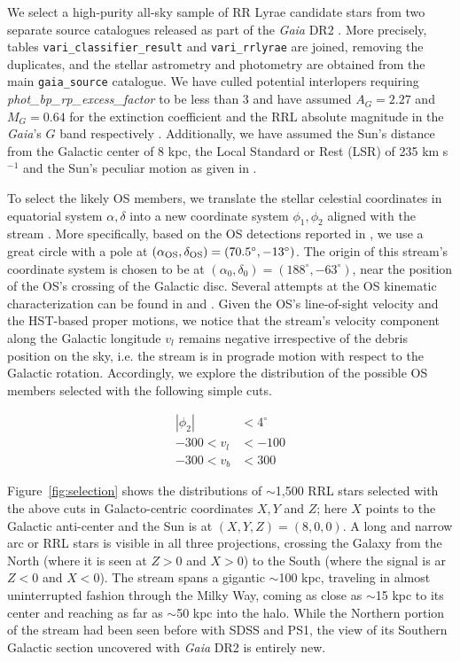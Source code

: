 \documentclass[a4paper,useAMS,usenatbib]{mnras}
\newcommand{\Gaia}{{\it Gaia}}
\newcommand{\gaia}{\textit{Gaia} }
\begin{document}
We select a high-purity all-sky sample of RR Lyrae candidate stars
from two separate source catalogues released as part of the \gaia DR2
\citep[][]{Prusti2016, Brown2018}. More precisely, tables
\texttt{vari\_classifier\_result} and \texttt{vari\_rrlyrae}
\citep[see][]{Clementini2018,Holl2018} are joined, removing the
duplicates, and the stellar astrometry and photometry are obtained
from the main \texttt{gaia\_source} catalogue. We have culled
potential interlopers requiring \textit{phot\_bp\_rp\_excess\_factor}
to be less than 3 and have assumed $A_G=2.27$ and $M_G=0.64$ for the
extinction coefficient and the RRL absolute magnitude in the \Gaia's
$G$ band respectively \citep[see][for further
  details]{Iorio2018}. Additionally, we have assumed the Sun's
distance from the Galactic center of 8 kpc, the Local Standard or Rest
(LSR) of 235 km s$^{-1}$ and the Sun's peculiar motion as given in
\citet{LSR}.

To select the likely OS members, we translate the stellar celestial
coordinates in equatorial system $\alpha, \delta$ into a new
coordinate system $\phi_1, \phi_2$ aligned with the stream \citep[see
  e.g.][]{Koposov2010}. More specifically, based on the OS detections
reported in \citet{OS_V, OS_C, Newberg2010}, we use a great circle
with a pole at $(\alpha_{\rm OS}, \delta_{\rm OS})=(70.5^{\circ},
-13^{\circ})$. The origin of this stream's coordinate system is chosen
to be at $(\alpha_0, \delta_0)=(188^{\circ}, -63^{\circ})$, near the
position of the OS's crossing of the Galactic disc. Several attempts
at the OS kinematic characterization can be found in
\citet{Newberg2010} and \citet{Sohn2016}. Given the OS's line-of-sight
velocity and the HST-based proper motions, we notice that the stream's
velocity component along the Galactic longitude $v_l$ remains negative
irrespective of the debris position on the sky, i.e. the stream is in
prograde motion with respect to the Galactic rotation. Accordingly, we
explore the distribution of the possible OS members selected with the
following simple cuts.

%
\begin{equation}
  \begin{aligned}
    |\phi_2| &< 4^{\circ}\\
    -300<v_l &<-100\\
    -300<v_b &<300
  \end{aligned}
\end{equation}
%

Figure~\ref{fig:selection} shows the distributions of $\sim$1,500 RRL
stars selected with the above cuts in Galacto-centric coordinates
$X,Y$ and $Z$; here $X$ points to the Galactic anti-center and the Sun
is at $(X,Y,Z)=(8,0,0)$. A long and narrow arc or RRL stars is visible
in all three projections, crossing the Galaxy from the North (where it
is seen at $Z>0$ and $X>0$) to the South (where the signal is ar $Z<0$
and $X<0$). The stream spans a gigantic $\sim$100 kpc, traveling in
almost uninterrupted fashion through the Milky Way, coming as close as
$\sim$15 kpc to its center and reaching as far as $\sim$50 kpc into
the halo. While the Northern portion of the stream had been seen
before with SDSS and PS1, the view of its Southern Galactic section
uncovered with \gaia DR2 is entirely new.
\end{document}
